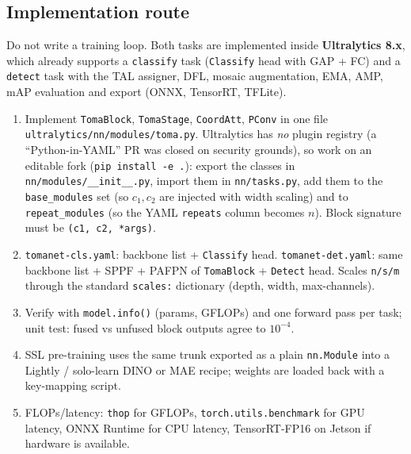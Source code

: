 \subsection{Implementation route}
\label{sec:impl}
Do not write a training loop. Both tasks are implemented inside \textbf{Ultralytics 8.x}, which already supports a \texttt{classify} task (\texttt{Classify} head with GAP + FC) and a \texttt{detect} task with the TAL assigner, DFL, mosaic augmentation, EMA, AMP, mAP evaluation and export (ONNX, TensorRT, TFLite).
\begin{enumerate}
  \item Implement \texttt{TomaBlock}, \texttt{TomaStage}, \texttt{CoordAtt}, \texttt{PConv} in one file \texttt{ultralytics/nn/modules/toma.py}. Ultralytics has \emph{no} plugin registry (a ``Python-in-YAML'' PR was closed on security grounds), so work on an editable fork (\texttt{pip install -e .}): export the classes in \texttt{nn/modules/\_\_init\_\_.py}, import them in \texttt{nn/tasks.py}, add them to the \texttt{base\_modules} set (so $c_1,c_2$ are injected with width scaling) and to \texttt{repeat\_modules} (so the YAML \texttt{repeats} column becomes $n$). Block signature must be \texttt{(c1, c2, *args)}.
  \item \texttt{tomanet-cls.yaml}: backbone list + \texttt{Classify} head. \texttt{tomanet-det.yaml}: same backbone list + SPPF + PAFPN of \texttt{TomaBlock} + \texttt{Detect} head. Scales \texttt{n/s/m} through the standard \texttt{scales:} dictionary (depth, width, max-channels).
  \item Verify with \texttt{model.info()} (params, GFLOPs) and one forward pass per task; unit test: fused vs unfused block outputs agree to $10^{-4}$.
  \item SSL pre-training uses the same trunk exported as a plain \texttt{nn.Module} into a Lightly / solo-learn DINO or MAE recipe; weights are loaded back with a key-mapping script.
  \item FLOPs/latency: \texttt{thop} for GFLOPs, \texttt{torch.utils.benchmark} for GPU latency, ONNX Runtime for CPU latency, TensorRT-FP16 on Jetson if hardware is available.
\end{enumerate}

